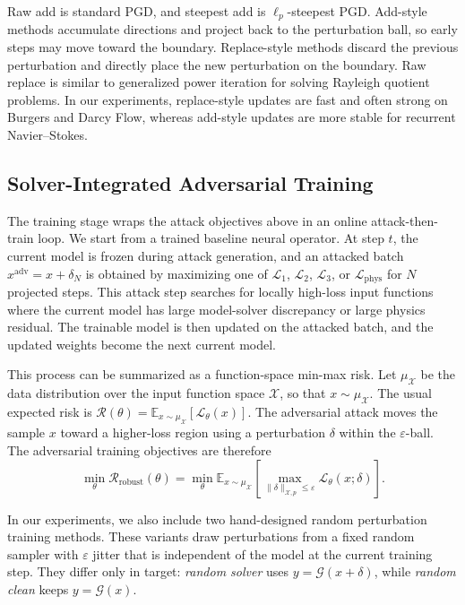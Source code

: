 ﻿\documentclass[letterpaper]{article} %
\begin{document}
Raw add is standard PGD, and steepest add is $\ell_p$-steepest PGD.
Add-style methods accumulate directions and project back
to the perturbation ball, so early steps may move toward the boundary.
Replace-style methods discard the previous perturbation and directly place the
new perturbation on the boundary. Raw replace is similar to generalized power
iteration for solving Rayleigh quotient problems.
In our experiments, replace-style updates are fast and often strong on Burgers
and Darcy Flow, whereas add-style updates are more stable for recurrent
Navier--Stokes.

\subsection{Solver-Integrated Adversarial Training}

The training stage wraps the attack objectives above in an online
attack-then-train loop. We start from a trained baseline neural operator. At
step $t$, the current model is frozen during attack generation, and an attacked
batch $x^{\mathrm{adv}}=x+\delta_N$ is obtained by maximizing one of
$\mathcal{L}_1$, $\mathcal{L}_2$, $\mathcal{L}_3$, or
$\mathcal{L}_{\mathrm{phys}}$ for $N$ projected steps. This attack step searches
for locally high-loss input functions where the current model has large
model-solver discrepancy or large physics residual. The trainable model is
then updated on the attacked batch, and the updated weights become the next
current model.

This process can be summarized as a function-space min-max risk.  Let
$\mu_{\mathcal X}$ be the data distribution over the input function space
$\mathcal X$, so that $x\sim\mu_{\mathcal X}$.  The usual expected risk is
\(\mathcal R(\theta)=
\mathbb E_{x\sim\mu_{\mathcal X}}[\mathcal L_\theta(x)]\). The adversarial
attack moves the sample \(x\) toward a higher-loss
region using a perturbation \(\delta\) within the \(\varepsilon\)-ball. The
adversarial training objectives are therefore
\[
  \min_\theta \mathcal R_{\mathrm{robust}}(\theta)
  =
  \min_\theta
  \mathbb E_{x\sim\mu_{\mathcal X}}
  \left[
    \max_{\|\delta\|_{\mathcal X,p}\le \varepsilon}
    \mathcal L_\theta(x;\delta)
  \right].
\]

In our experiments, we also include two hand-designed random perturbation
training methods. These variants draw perturbations from a fixed random sampler
with $\varepsilon$ jitter that is independent of the model at the current
training step. They differ only in target: \emph{random solver} uses
$y=\mathcal{G}(x+\delta)$, while \emph{random clean} keeps
$y=\mathcal{G}(x)$.
\end{document}
